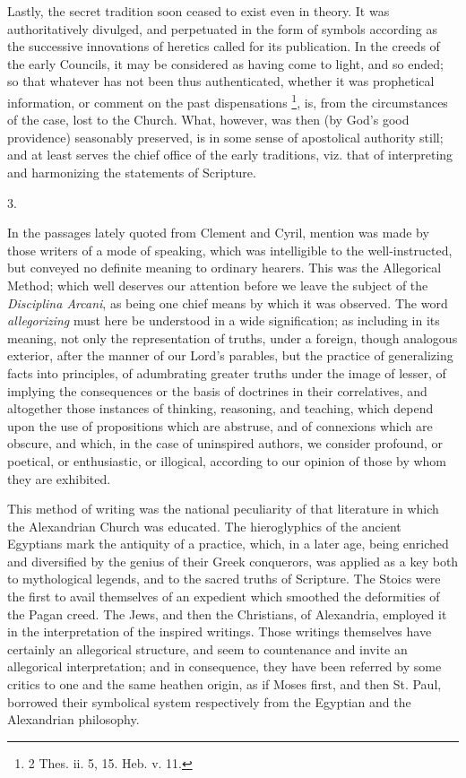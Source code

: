Lastly, the secret tradition soon ceased to exist even in theory.
It was authoritatively divulged, and perpetuated in the form of
symbols according as the successive innovations of heretics called for
its publication. In the creeds of the early Councils, it may be
considered as having come to light, and so ended; so that whatever has
not been thus authenticated, whether it was prophetical
information, or comment on the past dispensations \footnote{2 Thes. ii. 5, 15. Heb. v. 11.}, is, from the circumstances of the case, lost to the Church.
What, however, was then (by God's good providence) seasonably
preserved, is in some sense of apostolical authority still; and at
least serves the chief office of the early traditions, viz. that of
interpreting and harmonizing the statements of Scripture.

3.

In the passages lately quoted from Clement and Cyril, mention was
made by those writers of a mode of speaking, which was intelligible to
the well-instructed, but conveyed no definite meaning to ordinary
hearers. This was the Allegorical Method; which well deserves our
attention before we leave the subject of the \emph{Disciplina Arcani},
as being one chief means by which it was observed. The word \emph{allegorizing}
must here be understood in a wide signification; as including in its
meaning, not only the representation of truths, under a foreign,
though analogous exterior, after the manner of our Lord's parables,
but the practice of generalizing facts into principles, of adumbrating
greater truths under the image of lesser, of implying the consequences
or the basis of doctrines in their correlatives, and altogether those
instances of thinking, reasoning, and teaching, which depend upon the
use of propositions which are abstruse, and of connexions which are
obscure, and which, in the case of uninspired authors, we consider
profound, or poetical, or enthusiastic, or illogical, according to our
opinion of those by whom they are exhibited.

This method of writing was the national peculiarity of that
literature in which the Alexandrian Church was educated. The
hieroglyphics of the ancient Egyptians mark the antiquity of a
practice, which, in a later age, being enriched and diversified by the
genius of their Greek conquerors, was applied as a key both to
mythological legends, and to the sacred truths of Scripture. The
Stoics were the first to avail themselves of an expedient which
smoothed the deformities of the Pagan creed. The Jews, and then the
Christians, of Alexandria, employed it in the interpretation of the
inspired writings. Those writings themselves have certainly an
allegorical structure, and seem to countenance and invite an
allegorical interpretation; and in consequence, they have been
referred by some critics to one and the same heathen origin, as if
Moses first, and then St. Paul, borrowed their symbolical system
respectively from the Egyptian and the Alexandrian philosophy.

